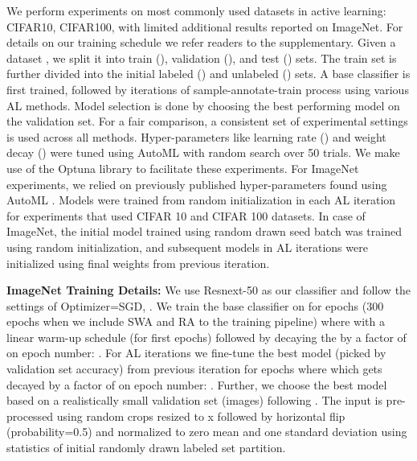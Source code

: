 \documentclass[10pt,twocolumn,letterpaper]{article}
\begin{document}
We perform experiments on most commonly used datasets in active learning: CIFAR10, CIFAR100, with limited additional results reported on ImageNet. 
For details on our training schedule we refer readers to the supplementary.
Given a dataset , we split it into train (), validation (), and test () sets. The train set is further divided into the initial labeled () and unlabeled () sets. A base classifier  is first trained, followed by iterations of sample-annotate-train process using various AL methods. Model selection is done by choosing the best performing model on the validation set. For a fair comparison, a consistent set of experimental settings is used across all methods. 
Hyper-parameters like learning rate () and weight decay () were tuned using AutoML with random search over 50 trials. We make use of the Optuna library \cite{optuna_akiba2019optuna} to facilitate these experiments. For ImageNet experiments, we relied on previously published hyper-parameters found using AutoML \cite{S4L_DBLP:journals/corr/abs-1905-03670}.
Models were trained from random initialization in each AL iteration for experiments that used CIFAR 10 and CIFAR 100 datasets. In case of ImageNet, the initial model trained using random drawn seed batch was trained using random initialization, and subsequent models in AL iterations were initialized using final weights from previous iteration.

\noindent \textbf{ImageNet Training Details: }We use Resnext-50 \cite{resnext_50_xie2017aggregated} as our classifier and follow the settings of \cite{S4L_DBLP:journals/corr/abs-1905-03670} \ie
Optimizer=SGD,  
. We train the base classifier on  for  epochs (300 epochs when we include SWA and RA to the training pipeline) where  with a linear warm-up schedule (for first  epochs) followed by decaying the  by a factor of  on epoch number: . For AL iterations we fine-tune the best model (picked by validation set accuracy) from previous iteration for  epochs where  which gets decayed by a factor of  on epoch number: . Further, we choose the best model based on a realistically small validation set (\ie  images) following \cite{S4L_DBLP:journals/corr/abs-1905-03670}. The input is pre-processed using random crops resized to  x  followed by horizontal flip (probability=0.5) and normalized to zero mean and one standard deviation using statistics of initial randomly drawn labeled set partition.
\end{document}
